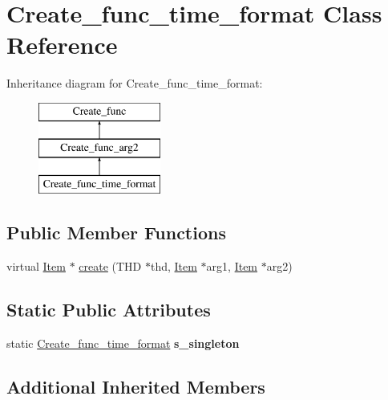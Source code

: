\hypertarget{classCreate__func__time__format}{}\section{Create\+\_\+func\+\_\+time\+\_\+format Class Reference}
\label{classCreate__func__time__format}
Inheritance diagram for Create\+\_\+func\+\_\+time\+\_\+format\+:\begin{figure}[H]
\begin{center}
\leavevmode
\includegraphics[height=3.000000cm]{classCreate__func__time__format}
\end{center}
\end{figure}
\subsection*{Public Member Functions}
\begin{DoxyCompactItemize}
\item 
virtual \mbox{\hyperlink{classItem}{Item}} $\ast$ \mbox{\hyperlink{classCreate__func__time__format_a39bb8a62de8a9ed18f5a9f2e8ca67bba}{create}} (T\+HD $\ast$thd, \mbox{\hyperlink{classItem}{Item}} $\ast$arg1, \mbox{\hyperlink{classItem}{Item}} $\ast$arg2)
\end{DoxyCompactItemize}
\subsection*{Static Public Attributes}
\begin{DoxyCompactItemize}
\item 
\mbox{\label{classCreate__func__time__format_a6cda9367786d7a8ca165fd6274443beb}} 
static \mbox{\hyperlink{classCreate__func__time__format}{Create\+\_\+func\+\_\+time\+\_\+format}} {\bfseries s\+\_\+singleton}
\end{DoxyCompactItemize}
\subsection*{Additional Inherited Members}


